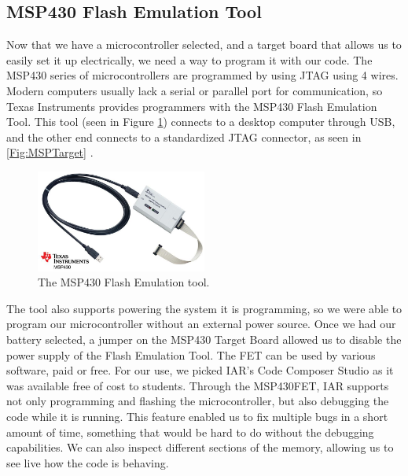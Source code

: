 \subsection{MSP430 Flash Emulation Tool}
\label{Sec:MSP430FET}
Now that we have a microcontroller selected, and a target board that allows us to easily set it up electrically, we need a way to program it with our code. The MSP430 series of microcontrollers are programmed by using JTAG using 4 wires. Modern computers usually lack a serial or parallel port for communication, so Texas Instruments provides programmers with the MSP430 Flash Emulation Tool. This tool (seen in Figure \ref{Fig:MSP430FET}) connects to a desktop computer through USB, and the other end connects to a standardized JTAG connector, as seen in \ref{Fig:MSPTarget} \cite{Web:MSPFETPAGE}. 
\begin{figure}
\begin{center}
\includegraphics[width=0.5\textwidth]{images/MSP430FETUIF.jpg}
\caption{The MSP430 Flash Emulation tool.}
\label{Fig:MSP430FET}
\end{center}
\end{figure}

The tool also supports powering the system it is programming, so we were able to program our microcontroller without an external power source. Once we had our battery selected, a jumper on the MSP430 Target Board allowed us to disable the power supply of the Flash Emulation Tool. The FET can be used by various software, paid or free. For our use, we picked IAR's Code Composer Studio as it was available free of cost to students. Through the MSP430FET, IAR supports not only programming and flashing the microcontroller, but also debugging the code while it is running. This feature enabled us to fix multiple bugs in a short amount of time, something that would be hard to do without the debugging capabilities. We can also inspect different sections of the memory, allowing us to see live how the code is behaving.

